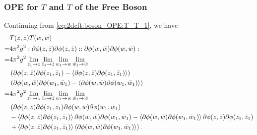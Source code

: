 \documentclass[10pt]{article}
\begin{document}
\subsubsection{OPE for \texorpdfstring{$T$}{T} and \texorpdfstring{$T$}{T} of the Free Boson\label{appendix:deriva_OPE:boson_T_T}}
Continuing from \cref{eq:2dcft:boson_OPE:T_T_1}, we have
\begin{align}
      & T(z,\bar{z})T(w,\bar{w})\notag                                                                                                                                                                                                     \\
    = & 4\pi^2 g^2:\partial\phi(z,\bar{z})\partial\phi(z,\bar{z})::\partial\phi(w,\bar{w})\partial\phi(w,\bar{w}):\notag                                                                                                                   \\
    = & 4\pi^2 g^2\lim_{z_1\to z}\lim_{\bar{z}_1\to\bar{z}}\lim_{w_1\to w}\lim_{\bar{w}_1\to\bar{w}}\notag                                                                                                                                 \\
      & \left(\partial\phi(z,\bar{z})\partial\phi(z_1,\bar{z}_1)-\expval{\partial\phi(z,\bar{z})\partial\phi(z_1,\bar{z}_1)}\right)\notag                                                                                                  \\
      & \left(\partial\phi(w,\bar{w})\partial\phi(w_1,\bar{w}_1)-\expval{\partial\phi(w,\bar{w})\partial\phi(w_1,\bar{w}_1)}\right)\notag                                                                                                  \\
    = & 4\pi^2 g^2\lim_{z_1\to z}\lim_{\bar{z}_1\to\bar{z}}\lim_{w_1\to w}\lim_{\bar{w}_1\to\bar{w}}\notag                                                                                                                                 \\
      & \left(\partial\phi(z,\bar{z})\partial\phi(z_1,\bar{z}_1)\partial\phi(w,\bar{w})\partial\phi(w_1,\bar{w}_1)\right.\notag                                                                                                            \\
      & -\expval{\partial\phi(z,\bar{z})\partial\phi(z_1,\bar{z}_1)}\partial\phi(w,\bar{w})\partial\phi(w_1,\bar{w}_1)-\expval{\partial\phi(w,\bar{w})\partial\phi(w_1,\bar{w}_1)}\partial\phi(z,\bar{z})\partial\phi(z_1,\bar{z}_1)\notag \\
      & \left.+\expval{\partial\phi(z,\bar{z})\partial\phi(z_1,\bar{z}_1)}\expval{\partial\phi(w,\bar{w})\partial\phi(w_1,\bar{w}_1)}\right).\label{eq:app:OPE:boson:TT:1}
\end{align}
\end{document}
